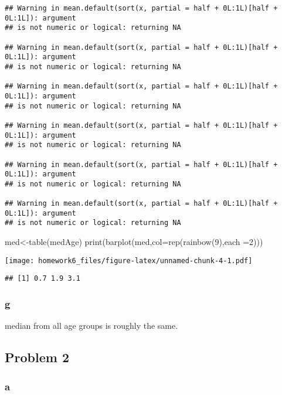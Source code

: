\documentclass[
  12pt,
]{article}
\newenvironment{Shaded}{\begin{snugshade}}{\end{snugshade}}
\newcommand{\NormalTok}[1]{#1}
\begin{document}
\begin{verbatim}
## Warning in mean.default(sort(x, partial = half + 0L:1L)[half + 0L:1L]): argument
## is not numeric or logical: returning NA

## Warning in mean.default(sort(x, partial = half + 0L:1L)[half + 0L:1L]): argument
## is not numeric or logical: returning NA

## Warning in mean.default(sort(x, partial = half + 0L:1L)[half + 0L:1L]): argument
## is not numeric or logical: returning NA

## Warning in mean.default(sort(x, partial = half + 0L:1L)[half + 0L:1L]): argument
## is not numeric or logical: returning NA

## Warning in mean.default(sort(x, partial = half + 0L:1L)[half + 0L:1L]): argument
## is not numeric or logical: returning NA

## Warning in mean.default(sort(x, partial = half + 0L:1L)[half + 0L:1L]): argument
## is not numeric or logical: returning NA
\end{verbatim}

\begin{Shaded}
\begin{Highlighting}[]
\NormalTok{med\textless{}{-}table(medAge)}
\NormalTok{print(barplot(med,col=rep(rainbow(9),each =2)))}
\end{Highlighting}
\end{Shaded}

\texttt{[image: homework6\_files/figure-latex/unnamed-chunk-4-1.pdf]}

\begin{verbatim}
## [1] 0.7 1.9 3.1
\end{verbatim}

\hypertarget{g}{%
\subsubsection{g}\label{g}}

median from all age groups is roughly the same.

\hypertarget{problem-2}{%
\subsection{Problem 2}\label{problem-2}}

\hypertarget{a-1}{%
\subsubsection{a}\label{a-1}}
\end{document}
